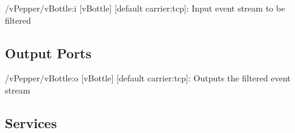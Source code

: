 \begin{DoxyItemize}
\item /v\+Pepper/v\+Bottle\+:i \mbox{[}v\+Bottle\mbox{]} \mbox{[}default carrier\+:tcp\mbox{]}\+: Input event stream to be filtered
\end{DoxyItemize}\hypertarget{group__zynqGrabber_outputports_sec}{}\subsection{Output Ports}\label{group__zynqGrabber_outputports_sec}

\begin{DoxyItemize}
\item /v\+Pepper/v\+Bottle\+:o \mbox{[}v\+Bottle\mbox{]} \mbox{[}default carrier\+:tcp\mbox{]}\+: Outputs the filtered event stream
\end{DoxyItemize}\hypertarget{group__zynqGrabber_services_sec}{}\subsection{Services}\label{group__zynqGrabber_services_sec}
